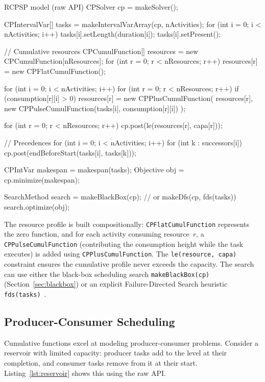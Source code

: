 \documentclass[11pt, a4paper]{scrartcl}
\begin{document}
\begin{codebox}[label={lst:rcpsp}]{RCPSP model (raw API)}
CPSolver cp = makeSolver();

CPIntervalVar[] tasks = makeIntervalVarArray(cp, nActivities);
for (int i = 0; i < nActivities; i++) {
    tasks[i].setLength(duration[i]);
    tasks[i].setPresent();
}

// Cumulative resources
CPCumulFunction[] resources = new CPCumulFunction[nResources];
for (int r = 0; r < nResources; r++) {
    resources[r] = new CPFlatCumulFunction();
}

for (int i = 0; i < nActivities; i++) {
    for (int r = 0; r < nResources; r++) {
        if (consumption[r][i] > 0) {
            resources[r] = new CPPlusCumulFunction(
                resources[r],
                new CPPulseCumulFunction(tasks[i], consumption[r][i])
            );
        }
    }
}

for (int r = 0; r < nResources; r++) {
    cp.post(le(resources[r], capa[r]));
}

// Precedences
for (int i = 0; i < nActivities; i++) {
    for (int k : successors[i]) {
        cp.post(endBeforeStart(tasks[i], tasks[k]));
    }
}

CPIntVar makespan = makespan(tasks);
Objective obj = cp.minimize(makespan);

SearchMethod search = makeBlackBox(cp); // or makeDfs(cp, fds(tasks))
search.optimize(obj);
\end{codebox}

The resource profile is built compositionally:
\texttt{CPFlatCumulFunction} represents the zero function, and for each activity consuming resource~$r$,
a \texttt{CPPulseCumulFunction} (contributing the consumption height while the task executes) is added using \texttt{CPPlusCumulFunction}.
The \texttt{le(resource, capa)} constraint ensures the cumulative profile never exceeds the capacity.
The search can use either the black-box scheduling search \texttt{makeBlackBox(cp)} (Section~\ref{sec:blackbox}) or an explicit Failure-Directed Search heuristic \texttt{fds(tasks)}~\cite{failureDirectedSearch}.

\subsection{Producer-Consumer Scheduling}

Cumulative functions excel at modeling producer-consumer problems.
Consider a reservoir with limited capacity: producer tasks add to the level at their completion,
and consumer tasks remove from it at their start. Listing~\ref{lst:reservoir} shows this using the raw API.
\end{document}
